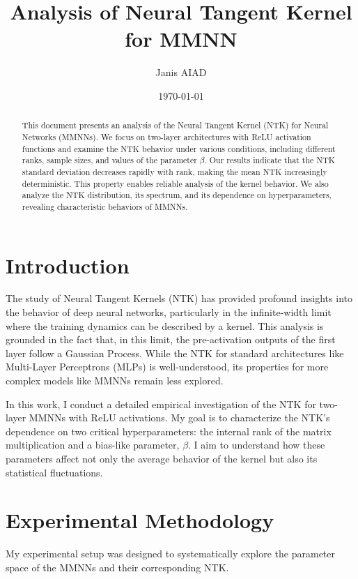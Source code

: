 \documentclass[12pt]{article}
\title{Analysis of Neural Tangent Kernel for MMNN}
\author{Janis AIAD}
\date{\today}
\begin{document}
\maketitle

\begin{abstract}
    This document presents an analysis of the Neural Tangent Kernel (NTK) for  Neural Networks (MMNNs). We focus on two-layer architectures with ReLU activation functions and examine the NTK behavior under various conditions, including different ranks, sample sizes, and values of the parameter $\beta$. Our results indicate that the NTK standard deviation decreases rapidly with rank, making the mean NTK increasingly deterministic. This property enables reliable analysis of the kernel behavior. We also analyze the NTK distribution, its spectrum, and its dependence on hyperparameters, revealing characteristic behaviors of MMNNs.
\end{abstract}

\section{Introduction}
The study of Neural Tangent Kernels (NTK) has provided profound insights into the behavior of deep neural networks, particularly in the infinite-width limit where the training dynamics can be described by a kernel. This analysis is grounded in the fact that, in this limit, the pre-activation outputs of the first layer follow a Gaussian Process. While the NTK for standard architectures like Multi-Layer Perceptrons (MLPs) is well-understood, its properties for more complex models like MMNNs remain less explored.

In this work, I conduct a detailed empirical investigation of the NTK for two-layer MMNNs with ReLU activations. My goal is to characterize the NTK's dependence on two critical hyperparameters: the internal rank of the matrix multiplication and a bias-like parameter, $\beta$. I aim to understand how these parameters affect not only the average behavior of the kernel but also its statistical fluctuations.

\section{Experimental Methodology}
My experimental setup was designed to systematically explore the parameter space of the MMNNs and their corresponding NTK.
\end{document}
